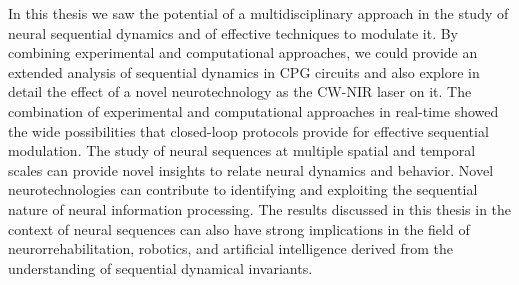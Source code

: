 In this thesis we saw the potential of a multidisciplinary approach in the study of neural sequential dynamics and of effective techniques to modulate it. By combining experimental and computational approaches, we could provide an extended analysis of sequential dynamics in CPG circuits and also explore in detail the effect of a novel neurotechnology as the CW-NIR laser on it. The combination of experimental and computational approaches in real-time showed the wide possibilities that closed-loop protocols provide for effective sequential modulation. The study of neural sequences at multiple spatial and temporal scales can provide novel insights to relate neural dynamics and behavior. Novel neurotechnologies can contribute to identifying and exploiting the sequential nature of neural information processing. The results discussed in this thesis in the context of neural sequences can also have strong implications in the field of neurorrehabilitation, robotics, and artificial intelligence derived from the understanding of sequential dynamical invariants. 




